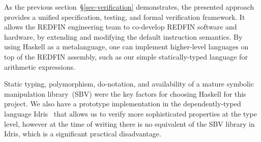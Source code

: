 




As the previous section~\S\ref{sec-verification} demonstrates, the presented
approach provides a unified specification, testing, and formal verification
framework. It allows the REDFIN engineering team to co-develop REDFIN software
and hardware, by extending and modifying the default instruction semantics.
By using Haskell as a metalanguage, one can implement higher-level languages on
top of the REDFIN assembly, such as our simple statically-typed language for
arithmetic expressions.

Static typing, polymorphism, \textsf{do}-notation, and availability of a mature
symbolic manipulation library~(SBV) were the key factors for choosing Haskell
for this project. We also have a prototype implementation in the
dependently-typed language Idris~\cite{JFP:9060502} that allows us to verify
more sophisticated properties at the type level, however at the time of writing
there is no equivalent of the SBV library in Idris, which is a significant
practical disadvantage.

